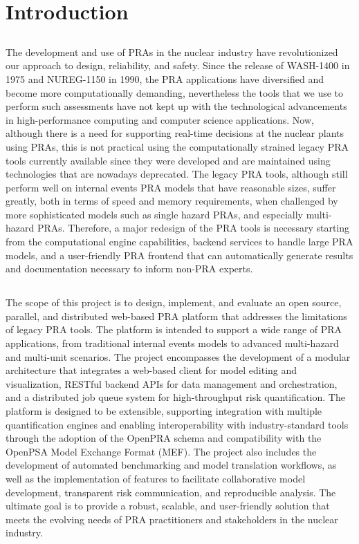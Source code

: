 \chapter{Introduction}

\section{\color{blue}{Project Motivation}}
The development and use of PRAs in the nuclear industry have revolutionized our approach to design, reliability, and safety. Since the release of WASH-1400 in 1975 and NUREG-1150 in 1990, the PRA applications have diversified and become more computationally demanding, nevertheless the tools that we use to perform such assessments have not kept up with the technological advancements in high-performance computing and computer science applications. Now, although there is a need for supporting real-time decisions at the nuclear plants using PRAs, this is not practical using the computationally strained legacy PRA tools currently available since they were developed and are maintained using technologies that are nowadays deprecated. The legacy PRA tools, although still perform well on internal events PRA models that have reasonable sizes, suffer greatly, both in terms of speed and memory requirements, when challenged by more sophisticated models such as single hazard PRAs, and especially multi-hazard PRAs. Therefore, a major redesign of the PRA tools is necessary starting from the computational engine capabilities, backend services to handle large PRA models, and a user-friendly PRA frontend that can automatically generate results and documentation necessary to inform non-PRA experts.

\section{\color{blue}{Project Scope}}
The scope of this project is to design, implement, and evaluate an open source, parallel, and distributed web-based PRA platform that addresses the limitations of legacy PRA tools. The platform is intended to support a wide range of PRA applications, from traditional internal events models to advanced multi-hazard and multi-unit scenarios. The project encompasses the development of a modular architecture that integrates a web-based client for model editing and visualization, RESTful backend APIs for data management and orchestration, and a distributed job queue system for high-throughput risk quantification. The platform is designed to be extensible, supporting integration with multiple quantification engines and enabling interoperability with industry-standard tools through the adoption of the OpenPRA schema and compatibility with the OpenPSA Model Exchange Format (MEF). The project also includes the development of automated benchmarking and model translation workflows, as well as the implementation of features to facilitate collaborative model development, transparent risk communication, and reproducible analysis. The ultimate goal is to provide a robust, scalable, and user-friendly solution that meets the evolving needs of PRA practitioners and stakeholders in the nuclear industry.

